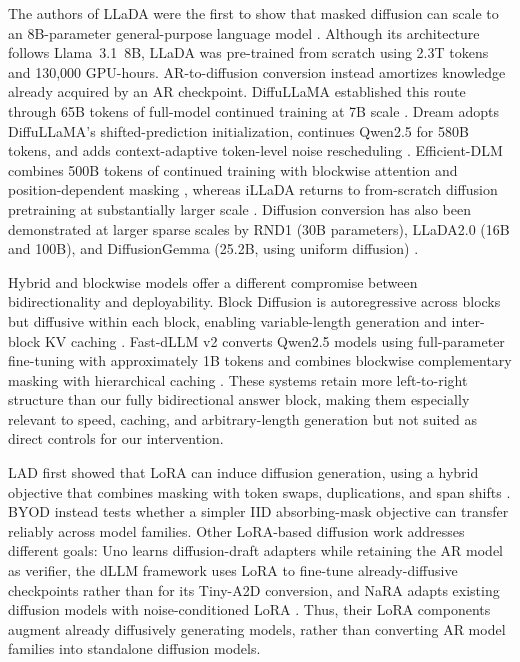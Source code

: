 \documentclass{article}
\newcommand{\method}{BYOD}
\begin{document}
The authors of LLaDA were the first to show that masked diffusion can scale to an 8B-parameter general-purpose language model \citep{nie2025llada}. Although its architecture follows Llama~3.1~8B, LLaDA was pre-trained from scratch using 2.3T tokens and 130,000 GPU-hours. AR-to-diffusion conversion instead amortizes knowledge already acquired by an AR checkpoint. DiffuLLaMA established this route through 65B tokens of full-model continued training at 7B scale \citep{gong2025diffullama}. Dream adopts DiffuLLaMA's shifted-prediction initialization, continues Qwen2.5 for 580B tokens, and adds context-adaptive token-level noise rescheduling \citep{ye2025dream}. Efficient-DLM combines 500B tokens of continued training with blockwise attention and position-dependent masking \citep{fu2025efficientdlm}, whereas iLLaDA returns to from-scratch diffusion pretraining at substantially larger scale \citep{nie2026illada}. Diffusion conversion has also been demonstrated at larger sparse scales by RND1 (30B parameters), LLaDA2.0 (16B and 100B), and DiffusionGemma (25.2B, using uniform diffusion) \citep{chandrasegaran2025rnd1,bie2025llada20,diffusiongemma2026}. 

Hybrid and blockwise models offer a different compromise between bidirectionality and deployability. Block Diffusion is autoregressive across blocks but diffusive within each block, enabling variable-length generation and inter-block KV caching \citep{arriola2025block}. Fast-dLLM v2 converts Qwen2.5 models using full-parameter fine-tuning with approximately 1B tokens and combines blockwise complementary masking with hierarchical caching \citep{wu2025fastdllmv2}. These systems retain more left-to-right structure than our fully bidirectional answer block, making them especially relevant to speed, caching, and arbitrary-length generation but not suited as direct controls for our intervention.

LAD first showed that LoRA can induce diffusion generation, using a hybrid objective that combines masking with token swaps, duplications, and span shifts \citep{kuiper2025lad,hu2022lora}. \method{} instead tests whether a simpler IID absorbing-mask objective can transfer reliably across model families. Other LoRA-based diffusion work addresses different goals: Uno learns diffusion-draft adapters while retaining the AR model as verifier, the dLLM framework uses LoRA to fine-tune already-diffusive checkpoints rather than for its Tiny-A2D conversion, and NaRA adapts existing diffusion models with noise-conditioned LoRA \citep{sahoo2026uno,zhou2026dllm,wang2026nara}. Thus, their LoRA components augment already diffusively generating models, rather than converting AR model families into standalone diffusion models.
\end{document}
